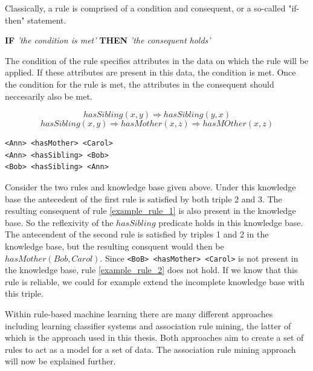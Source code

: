 Classically, a rule is comprised of a condition and consequent, or a so-called "if-then" statement. \begin{center} \textbf{IF} \textit{'the condition is met'} \textbf{THEN} \textit{'the consequent holds'} \end{center}
The condition of the rule specifies attributes in the data on which the rule will be applied. If these attributes are present in this data, the condition is met. Once the condition for the rule is met, the attributes in the consequent should neccesarily also be met.

\begin{equation}
hasSibling(x, y) \Rightarrow hasSibling(y,x)
\label{example_rule_1}
\end{equation}
\begin{equation}
    hasSibling(x, y) \Rightarrow hasMother(x,z) \Rightarrow hasMOther(x, z)
    \label{example_rule_2}
\end{equation}
\begin{lstlisting}[caption={Simple example knowledge base},captionpos=b, label={simple_kb_example}]
<Ann> <hasMother> <Carol>
<Ann> <hasSibling> <Bob>
<Bob> <hasSibling> <Ann>
\end{lstlisting}
Consider the two rules and knowledge base given above. Under this knowledge base the antecedent of the first rule is satisfied by both triple 2 and 3. The resulting consequent of rule \ref{example_rule_1} is also present in the knowledge base. So the reflexivity of the $hasSibling$ predicate holds in this knowledge base. The antecendent of the second rule is satisfied by triples 1 and 2 in the knowledge base, but the resulting consquent would then be $hasMother(Bob, Carol)$. Since \texttt{<BoB> <hasMother> <Carol>} is not present in the knowledge base, rule \ref{example_rule_2} does not hold. If we know that this rule is reliable, we could for example extend the incomplete knowledge base with this triple.

Within rule-based machine learning there are many different approaches including learning classifier systems\cite{sigaud2007learning} and association rule mining\cite{agrawal1993mining}, the latter of which is the approach used in this thesis. Both approaches aim to create a set of rules to act as a model for a set of data. The association rule mining approach will now be explained further.


